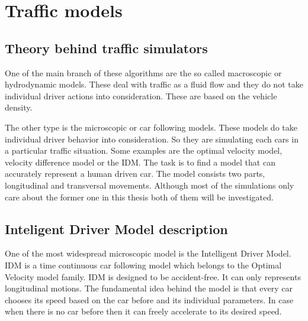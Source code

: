 \documentclass[a4paper,11pt,twoside]{report}
\begin{document}
	\chapter{Traffic models}
		\section{Theory behind traffic simulators}
			One of the main branch of these algorithms are the so called macroscopic or hydrodynamic models. These deal with traffic as a fluid flow and they do not take individual driver actions into consideration. These are based on the vehicle density.

			The other type is the microscopic or car following models. These models do take individual driver behavior into consideration. So they are simulating each cars in a particular traffic situation. Some examples are the optimal velocity model, velocity difference model or the IDM. The task is to find a model that can accurately represent a human driven car. The model consists two parts, longitudinal and transversal movements. Although most of the simulations only care about the former one in this thesis both of them will be investigated.
		\section{Inteligent Driver Model description}
			One of the most widespread microscopic model is the Intelligent Driver Model. IDM is a time continuous car following model which belongs to the Optimal Velocity model family. IDM is designed to be accident-free. It can only represents longitudinal motions. The fundamental idea behind the model is that every car chooses its speed based on the car before and its individual parameters. In case when there is no car before then it can freely accelerate to its desired speed.
\end{document}
